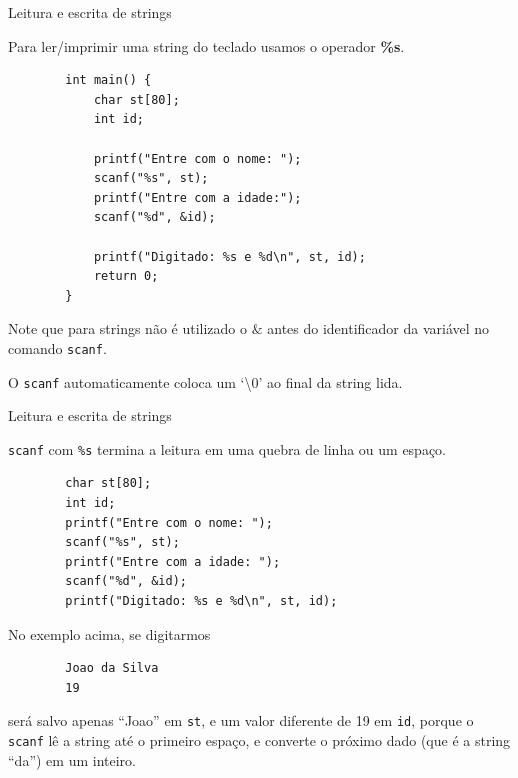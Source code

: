 \documentclass[handout]{beamer}
\newcommand{\cod}[1]{\texttt{#1}}
\begin{document}
\begin{frame}[fragile]{Leitura e escrita de strings}

    \small
    Para ler/imprimir uma string do teclado usamos o operador {\bf \%s}.

    \begin{verbatim}
        int main() {
            char st[80];
            int id;

            printf("Entre com o nome: ");
            scanf("%s", st);
            printf("Entre com a idade:");
            scanf("%d", &id);

            printf("Digitado: %s e %d\n", st, id);
            return 0;
        }
    \end{verbatim}

    Note que para strings não é utilizado o $\&$ antes do identificador da variável no comando \cod{scanf}.

    O \cod{scanf} automaticamente coloca um `\textbackslash0' ao final da string lida.

\end{frame}

\begin{frame}[fragile]{Leitura e escrita de strings}

    \small
    \cod{scanf} com \texttt{\%s} termina a leitura em uma quebra de linha ou um espaço.

    \begin{verbatim}
        char st[80];
        int id;
        printf("Entre com o nome: ");
        scanf("%s", st);
        printf("Entre com a idade: ");
        scanf("%d", &id);
        printf("Digitado: %s e %d\n", st, id);
    \end{verbatim}

    No exemplo acima, se digitarmos
    \begin{verbatim}
        Joao da Silva
        19
    \end{verbatim}
    será salvo apenas ``Joao'' em \cod{st}, e um valor diferente de 19 em \cod{id}, porque o \cod{scanf} lê a string até o primeiro espaço, e converte o próximo dado (que é a string ``da'') em um inteiro.

\end{frame}
\end{document}
